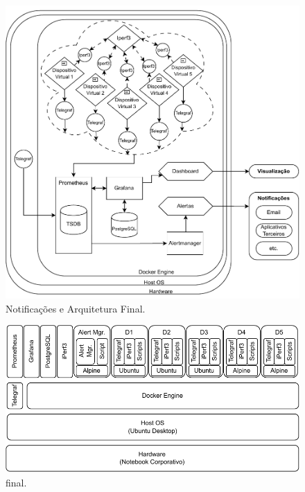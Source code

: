 \begin{figure}[H]
\centering
\setlength{\abovecaptionskip}{-20pt}
\includegraphics[width=\textwidth]{Imagens/chap04/by-blocks/alerts_diagram.pdf}
\caption{Notificações e Arquitetura Final.}
\label{fig:DiagramaAlertas}
\end{figure}


\begin{figure}[H]
\centering
\setlength{\abovecaptionskip}{-20pt}
\includegraphics[width=\textwidth]{Imagens/chap04/final_stack.pdf}
\caption{ final.}
\label{fig:StackFinal}
\end{figure}

